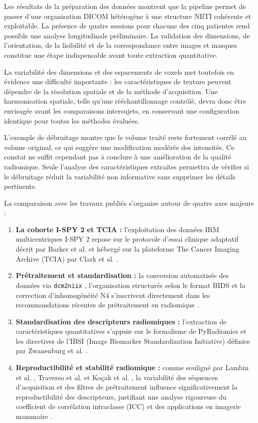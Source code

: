Les résultats de la préparation des données montrent que la pipeline permet de passer d'une organisation DICOM hétérogène à une structure NIfTI cohérente et exploitable. La présence de quatre sessions pour chacune des cinq patientes rend possible une analyse longitudinale préliminaire. La validation des dimensions, de l'orientation, de la lisibilité et de la correspondance entre images et masques constitue une étape indispensable avant toute extraction quantitative.

La variabilité des dimensions et des espacements de voxels met toutefois en évidence une difficulté importante : les caractéristiques de texture peuvent dépendre de la résolution spatiale et de la méthode d'acquisition. Une harmonisation spatiale, telle qu'une rééchantillonnage contrôlé, devra donc être envisagée avant les comparaisons intersujets, en conservant une configuration identique pour toutes les méthodes évaluées.

L'exemple de débruitage montre que le volume traité reste fortement corrélé au volume original, ce qui suggère une modification modérée des intensités. Ce constat ne suffit cependant pas à conclure à une amélioration de la qualité radiomique. Seule l'analyse des caractéristiques extraites permettra de vérifier si le débruitage réduit la variabilité non informative sans supprimer les détails pertinents.

La comparaison avec les travaux publiés s'organise autour de quatre axes majeurs :
\begin{enumerate}
    \item \textbf{La cohorte I-SPY 2 et TCIA :} l'exploitation des données IRM multicentriques I-SPY 2 repose sur le protocole d'essai clinique adaptatif décrit par Barker et al. \cite{barker2009} et hébergé sur la plateforme The Cancer Imaging Archive (TCIA) par Clark et al. \cite{clark2013}.
    \item \textbf{Prétraitement et standardisation :} la conversion automatisée des données via \texttt{dcm2niix} \cite{li2016}, l'organisation structurée selon le format BIDS \cite{gorgolewski2016} et la correction d'inhomogénéité N4 \cite{tustison2010} s'inscrivent directement dans les recommandations récentes de prétraitement en radiomique \cite{demircioglu2025}.
    \item \textbf{Standardisation des descripteurs radiomiques :} l'extraction de caractéristiques quantitatives s'appuie sur le formalisme de PyRadiomics \cite{vangriethuysen2017} et les directives de l'IBSI (Image Biomarker Standardization Initiative) définies par Zwanenburg et al. \cite{zwanenburg2020}.
    \item \textbf{Reproductibilité et stabilité radiomique :} comme souligné par Lambin et al. \cite{lambin2012}, Traverso et al. \cite{traverso2018} et Koçak et al. \cite{kocak2024}, la variabilité des séquences d'acquisition et des filtres de prétraitement influence significativement la reproductibilité des descripteurs, justifiant une analyse rigoureuse du coefficient de corrélation intraclasse (ICC) et des applications en imagerie mammaire \cite{pesapane2023}.
\end{enumerate}

